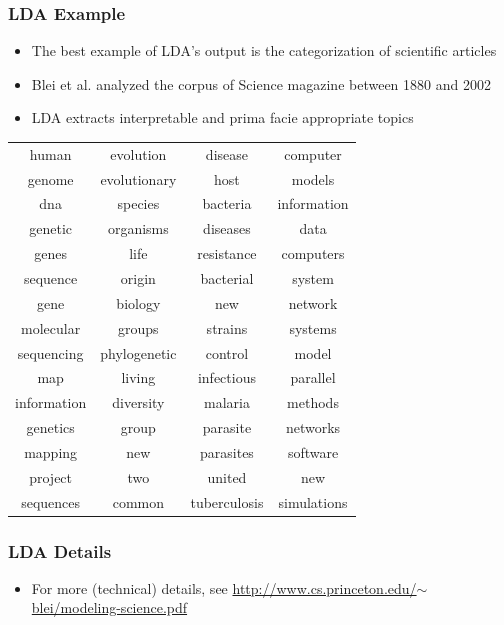 \documentclass[xcolor=dvipsnames, 9pt]{beamer}
\begin{document}
\begin{frame}[fragile]
  \frametitle{LDA Example}
  \begin{itemize}
    \item{The best example of LDA's output is the categorization of scientific articles}
    \item{Blei et al. analyzed the corpus of Science magazine between 1880 and 2002}
    \item{LDA extracts interpretable and prima facie appropriate topics}
  \end{itemize}
\end{frame}

\begin{frame}[fragile]
  \begin{center}
    \begin{tabular}{cccc}
      human & evolution & disease & computer \\
      genome & evolutionary & host & models \\
      dna & species & bacteria & information \\
      genetic & organisms & diseases & data \\
      genes & life & resistance & computers \\
      sequence & origin & bacterial & system \\
      gene & biology & new & network \\
      molecular & groups & strains & systems \\
      sequencing & phylogenetic & control & model \\
      map & living & infectious & parallel \\
      information & diversity & malaria & methods \\
      genetics & group & parasite & networks \\
      mapping & new & parasites & software \\
      project & two & united & new \\
      sequences & common & tuberculosis & simulations \\
    \end{tabular}
  \end{center}
\end{frame}

\begin{frame}[fragile]
  \frametitle{LDA Details}
  
  \begin{itemize}
    \item{For more (technical) details, see 
\href{http://www.cs.princeton.edu/$\sim$blei/modeling-science.pdf}{http://www.cs.princeton.edu/$\sim$blei/modeling-science.pdf}}
  \end{itemize}
\end{frame}
\end{document}
